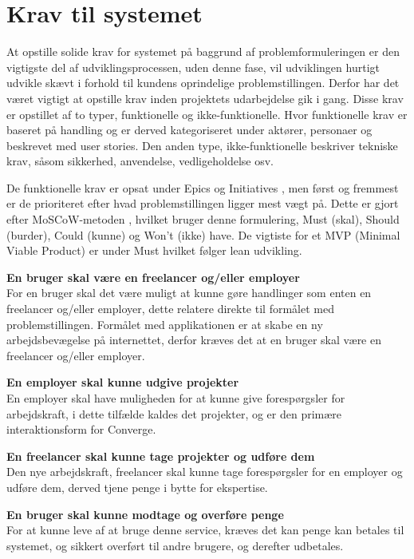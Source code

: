 \section{Krav til systemet}
\label{sec:system-requirements}

At opstille solide krav for systemet på baggrund af problemformuleringen er den vigtigste del af udviklingsprocessen, uden denne fase, vil udviklingen hurtigt udvikle skævt i forhold til kundens oprindelige problemstillingen. Derfor har det været vigtigt at opstille krav inden projektets udarbejdelse gik i gang. Disse krav er opstillet af to typer, funktionelle og ikke-funktionelle. Hvor funktionelle krav er baseret på handling og er derved kategoriseret under aktører, personaer og beskrevet med user stories. Den anden type, ikke-funktionelle beskriver tekniske krav, såsom sikkerhed, anvendelse, vedligeholdelse osv. 

De funktionelle krav er opsat under Epics og Initiatives , men først og fremmest er de prioriteret efter hvad problemstillingen ligger mest vægt på. Dette er gjort efter MoSCoW-metoden , hvilket bruger denne formulering, Must (skal), Should (burder), Could (kunne) og Won't (ikke) have. De vigtiste for et MVP (Minimal Viable Product) er under Must hvilket følger lean udvikling. 

\textbf{En bruger skal være en freelancer og/eller employer} \\
For en bruger skal det være muligt at kunne gøre handlinger som enten en freelancer og/eller employer, dette relatere direkte til formålet med problemstillingen. Formålet med applikationen er at skabe en ny arbejdsbevægelse på internettet, derfor kræves det at en bruger skal være en freelancer og/eller employer.

\textbf{En employer skal kunne udgive projekter} \\
En employer skal have muligheden for at kunne give forespørgsler for arbejdskraft, i dette tilfælde kaldes det projekter, og er den primære interaktionsform for Converge.

\textbf{En freelancer skal kunne tage projekter og udføre dem} \\
Den nye arbejdskraft, freelancer skal kunne tage forespørgsler for en employer og udføre dem, derved tjene penge i bytte for ekspertise.

\textbf{En bruger skal kunne modtage og overføre penge} \\
For at kunne leve af at bruge denne service, kræves det kan penge kan betales til systemet, og sikkert overført til andre brugere, og derefter udbetales.

